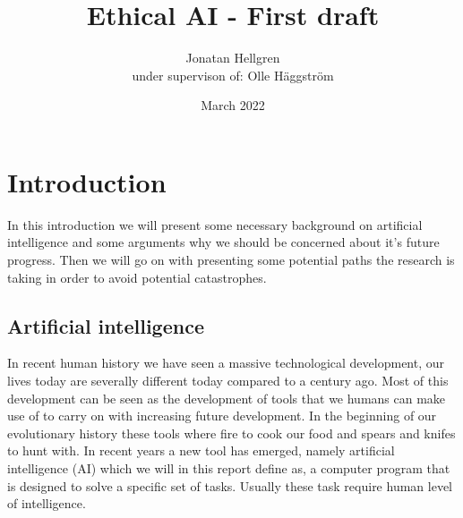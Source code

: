 \documentclass[12pt,A4]{report}
\title{Ethical AI - First draft}
\author{Jonatan Hellgren\\
under supervison of: Olle Häggström}
\date{March 2022}
\theoremstyle{definition}
\begin{document}
\maketitle


\thispagestyle{empty}

\newpage
{}

\tableofcontents

\newpage
{}


\chapter{Introduction}
In this introduction we will present some necessary background on artificial intelligence and some arguments why we should be concerned about it's future progress. Then we will go on with presenting some potential paths the research is taking in order to avoid potential catastrophes. 

\section{Artificial intelligence}

In recent human history we have seen a massive technological development, our lives today are severally different today compared to a century ago. Most of this development can be seen as the development of tools that we humans can make use of to carry on with increasing future development. In the beginning of our evolutionary history these tools where fire to cook our food and spears and knifes to hunt with. In recent years a new tool has emerged, namely artificial intelligence (AI) which we will in this report define as, a computer program that is designed to solve a specific set of tasks. Usually these task require human level of intelligence.
\end{document}
